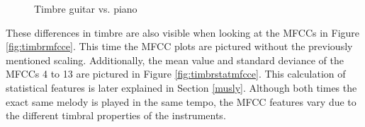 \begin{figure}[htbp]
	\centering
	\caption{Timbre guitar vs. piano}	
	\label{fig:timbre}
\end{figure}
\FloatBarrier
\noindent These differences in timbre are also visible when looking at the MFCCs in Figure \ref{fig:timbrmfcce}. This time the MFCC plots are pictured without the previously mentioned scaling. Additionally, the mean value and standard deviance of the MFCCs 4 to 13 are pictured in Figure \ref{fig:timbrstatmfcce}. This calculation of statistical features is later explained in Section \ref{musly}. Although both times the exact same melody is played in the same tempo, the MFCC features vary due to the different timbral properties of the instruments. 
